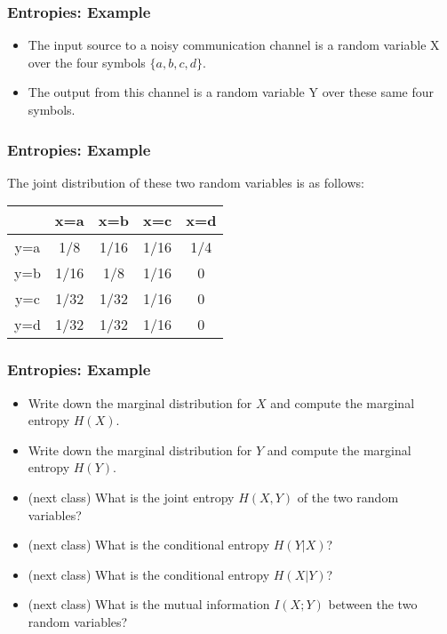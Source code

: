 \documentclass[a4]{beamer}
\begin{document}
\frametitle{Entropies: Example}
\begin{itemize}
\item The input source to a noisy communication channel is a random variable X over the
four symbols $\{a, b, c, d\}$. \item  The output from this channel is a random variable Y over these same
four symbols.
\end{itemize}



\frametitle{Entropies: Example}
The joint distribution of these two random variables is as follows:\\ \bigskip
\begin{center}
\begin{tabular}{|c|c|c|c|c|}
\hline
&x=a& x=b & x=c & x=d \\ \hline
y=a &1/8 &1/16 &1/16 &1/4 \\ \hline
y=b &1/16 & 1/8& 1/16& 0 \\ \hline
y=c & 1/32&1/32 & 1/16 & 0\\ \hline
y=d & 1/32& 1/32& 1/16 & 0\\ \hline
\end{tabular}
\end{center}


\frametitle{Entropies: Example}
\begin{itemize}
\item Write down the marginal distribution for $X$ and compute the marginal entropy $H(X)$.
\item Write down the marginal distribution for $Y$ and compute the marginal entropy $H(Y )$.
\item (next class) What is the joint entropy $H(X, Y ) $ of the two random variables?
\item (next class) What is the conditional entropy $H(Y|X)$?
\item (next class) What is the conditional entropy $H(X|Y)$?
\item (next class) What is the mutual information $I(X;Y)$ between the two random variables?
\end{itemize}

\end{document}
